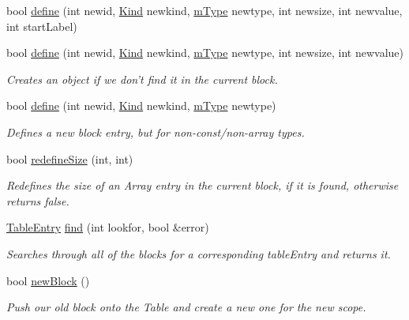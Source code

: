 \begin{DoxyCompactItemize}
bool \hyperlink{classBlockTable_a55f1008e44189505a5ba66d50daa60d5}{define} (int newid, \hyperlink{blocktable_8h_aa10c9e8951b8ccf714a59ec321bdac5b}{Kind} newkind, \hyperlink{blocktable_8h_a636cfca014f3212ea82d45e28f9cb51b}{mType} newtype, int newsize, int newvalue, int startLabel)
\item 
bool \hyperlink{classBlockTable_a52cc3e2d77fb52b3360b224b671ea6be}{define} (int newid, \hyperlink{blocktable_8h_aa10c9e8951b8ccf714a59ec321bdac5b}{Kind} newkind, \hyperlink{blocktable_8h_a636cfca014f3212ea82d45e28f9cb51b}{mType} newtype, int newsize, int newvalue)
\begin{DoxyCompactList}\small\item\em Creates an object if we don't find it in the current block. \item\end{DoxyCompactList}\item 
bool \hyperlink{classBlockTable_a7deb886fce54f404a28de69543cd837b}{define} (int newid, \hyperlink{blocktable_8h_aa10c9e8951b8ccf714a59ec321bdac5b}{Kind} newkind, \hyperlink{blocktable_8h_a636cfca014f3212ea82d45e28f9cb51b}{mType} newtype)
\begin{DoxyCompactList}\small\item\em Defines a new block entry, but for non-\/const/non-\/array types. \item\end{DoxyCompactList}\item 
bool \hyperlink{classBlockTable_a0475d9253127e652e48a24ff3c09b38c}{redefineSize} (int, int)
\begin{DoxyCompactList}\small\item\em Redefines the size of an Array entry in the current block, if it is found, otherwise returns false. \item\end{DoxyCompactList}\item 
\hyperlink{structTableEntry}{TableEntry} \hyperlink{classBlockTable_a53d24a1a4460701c8129eabcebfa0870}{find} (int lookfor, bool \&error)
\begin{DoxyCompactList}\small\item\em Searches through all of the blocks for a corresponding tableEntry and returns it. \item\end{DoxyCompactList}\item 
bool \hyperlink{classBlockTable_a6bdc70c8ad8a670f510803dc7df162ef}{newBlock} ()
\begin{DoxyCompactList}\small\item\em Push our old block onto the Table and create a new one for the new scope. \item\end{DoxyCompactList}\item 

\end{DoxyCompactItemize}
